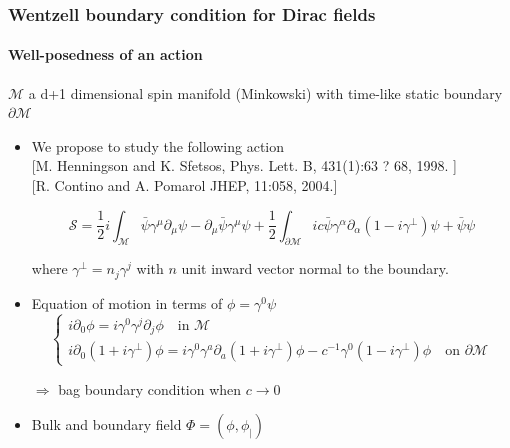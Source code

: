 \documentclass[french]{beamer}
\begin{document}
\begin{frame}[shrink=10]
\frametitle{Wentzell boundary condition for Dirac fields}
\framesubtitle{Well-posedness of an action}

$\mathcal{M}$ a d+1 dimensional spin manifold (Minkowski) with time-like static boundary $\partial\mathcal{M}$
\begin{itemize}
\item We propose to study the following action 
\\
\tiny\color{blue}[M. Henningson and K. Sfetsos,
Phys. Lett. B, 431(1):63 ? 68, 1998.
] \color{black}\normalsize
\\
\tiny\color{blue} [R. Contino and A. Pomarol JHEP, 11:058, 2004.]
\color{black}\normalsize


\begin{equation*}
\mathcal{S} = \frac{1}{2}i\int_{\mathcal{M}} \bar{\psi} \gamma^\mu \partial_\mu \psi - \partial_\mu \bar{\psi} \gamma^\mu \psi 
+ \frac{1}{2}\int_{\partial \mathcal{M}} ic \bar{\psi} \gamma^\alpha \partial_\alpha (1 - i \gamma^\bot) \psi
+ \bar{\psi} \psi
\end{equation*}

where $\gamma^\bot = n_j\gamma^j$ with $n$ unit inward vector normal to the boundary.

\item Equation of motion in terms of $\phi = \gamma^0 \psi$
\begin{equation*}
\begin{cases}
i \partial_0 \phi = i \gamma^0 \gamma^j \partial_j \phi   \quad \textrm{in $\mathcal{M}$}\\
i \partial_0(1 + i\gamma^\bot) \phi = i\gamma^0 \gamma^a \partial_a (1+ i\gamma^\bot)\phi - c^{-1} \gamma^0(1 - i \gamma^{\bot})\phi \quad \textrm{on $\partial \mathcal{M}$}
\end{cases}
\end{equation*}

$\Longrightarrow$ bag boundary condition when $c\rightarrow0$ 

\item Bulk and boundary field $\Phi = (\phi, \phi_|)$

\end{itemize}

\end{frame}
\end{document}
